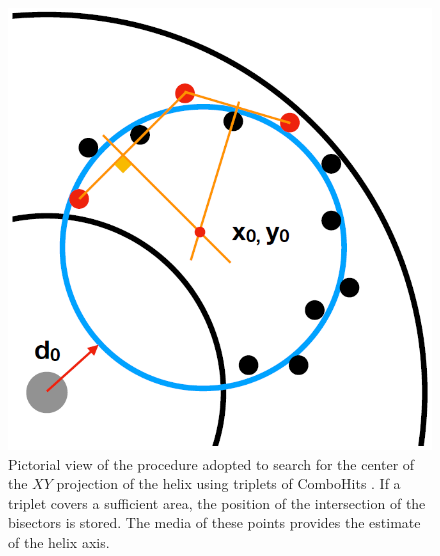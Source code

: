 \documentclass[12pt,a4paper,openright, oneside, titlepage]{book} %
\begin{document}
\begin{figure}[h!]
\centering
\includegraphics[scale=0.4]{giani_TrkPatRec_triplets}
\caption[Search for circles in $XY$]{Pictorial view of the procedure adopted to search for the center of the $XY$ projection 
of the helix using triplets of ComboHits \cite{GianiPatRec:2020}. 
If a triplet covers a sufficient area, the position of the intersection of the bisectors is stored. 
The media of these points provides the estimate of the helix axis.}
\label{_TrkPatRec_triplets}
\end{figure}
\end{document}
